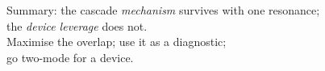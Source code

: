 \documentclass[aspectratio=169,11pt]{beamer}
\begin{document}
\begin{frame}[standout]
  Summary: the cascade \emph{mechanism} survives with one resonance;\\
  the \emph{device leverage} does not.\\[6pt]
  \normalsize Maximise the overlap; use it as a diagnostic;\\
  go two-mode for a device.
\end{frame}
\end{document}
